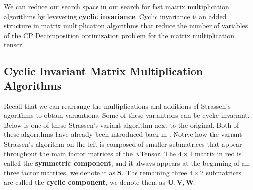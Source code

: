 
We can reduce our search space in our search for fast matrix multiplication
algorithms by levevering \textbf{cyclic invariance}. Cyclic invariance is an
added structure in matrix multiplication algorithms that reduce the number of
variables of the CP Decomposition optimization problem for the matrix
multiplication tensor. 

\subsection{Cyclic Invariant Matrix Multiplication Algorithms} \label{sec:Cyclic Invariant Matrix Multiplication Algorithms} 
    
    Recall that we can rearrange the multiplications and additions of Strassen's
    agorithms to obtain variantions. Some of these variantions can be cyclic
    invariant. Below is one of these Strassen's variant algorithm next to the
    original. Both of these algorithms have already been introduced back in
    . Notive how the variant
    Strassen's algorithm on the left is composed of smaller submatrices that
    appear throughout the main factor matrices of the KTensor. The $4\times 1$
    matrix in red is called the \textbf{symmetric component}, and it always
    appears at the beginning of all three factor matrices, we denote it as
    $\mathbf{S}$. The remaining three $4\times 2$ submatrices are called the
    \textbf{cyclic component}, we denote them as $\mathbf{U, V, W}$. 

